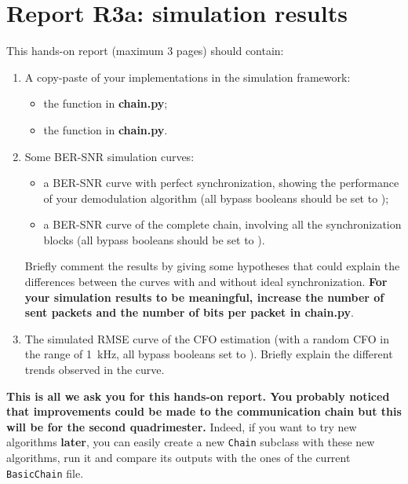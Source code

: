 \section{Report R3a: simulation results}
This hands-on report (maximum 3 pages) should contain:
\begin{enumerate}
    \item A copy-paste of your implementations in the simulation framework:
    \begin{itemize}
        \item the  function in \textbf{chain.py};
        \item the  function in \textbf{chain.py}.
    \end{itemize}
    \item Some BER-SNR simulation curves:
    \begin{itemize}
        \item a BER-SNR curve with perfect synchronization, showing the performance of your demodulation algorithm (all bypass booleans should be set to );
        \item a BER-SNR curve of the complete chain, involving all the synchronization blocks (all bypass booleans should be set to ).
    \end{itemize}
    Briefly comment the results by giving some hypotheses that could explain the differences between the curves with and without ideal synchronization. \textbf{For your simulation results to be meaningful, increase the number of sent packets and the number of bits per packet in \textbf{chain.py}}.
\item The simulated RMSE curve of the CFO estimation (with a random CFO in the range of \SI{1}{\kilo\hertz}, all bypass booleans set to ). Briefly explain the different trends observed in the curve.
\end{enumerate}

\textbf{This is all we ask you for this hands-on report. You probably noticed that improvements could be made to the communication chain but this will be for the second quadrimester.} Indeed, if you want to try new algorithms \textbf{later}, you can easily create a new \texttt{Chain} subclass with these new algorithms, run it and compare its outputs with the ones of the current \texttt{BasicChain} file.


